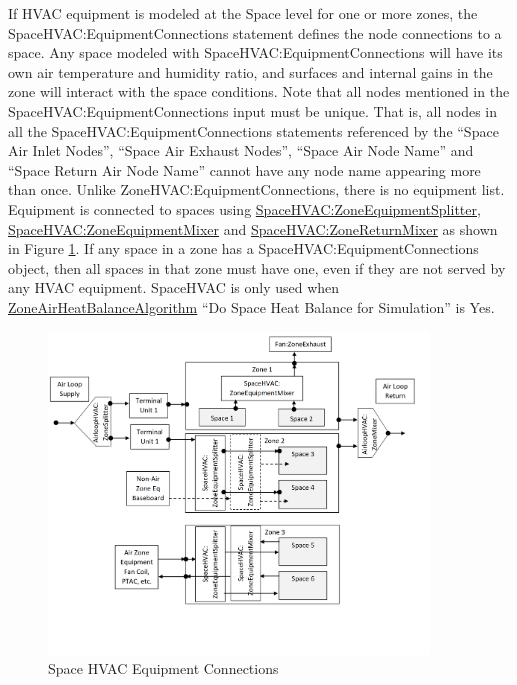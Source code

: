 If HVAC equipment is modeled at the Space level for one or more zones, the SpaceHVAC:EquipmentConnections statement defines the node connections to a space. Any space modeled with SpaceHVAC:EquipmentConnections will have its own air temperature and humidity ratio, and surfaces and internal gains in the zone will interact with the space conditions.
Note that all nodes mentioned in the SpaceHVAC:EquipmentConnections input must be unique. That is, all nodes in all the SpaceHVAC:EquipmentConnections statements referenced by the ``Space Air Inlet Nodes'', ``Space Air Exhaust Nodes'', ``Space Air Node Name'' and ``Space Return Air Node Name'' cannot have any node name appearing more than once. Unlike ZoneHVAC:EquipmentConnections, there is no equipment list. Equipment is connected to spaces using \hyperref[spacehvaczoneequipmentsplitter]{SpaceHVAC:ZoneEquipmentSplitter}, \hyperref[spacehvaczoneequipmentmixer]{SpaceHVAC:ZoneEquipmentMixer} and \hyperref[spacehvaczonereturnmixer]{SpaceHVAC:ZoneReturnMixer} as shown in Figure \ref{fig:space-hvac-equipment-connections}. If any space in a zone has a SpaceHVAC:EquipmentConnections object, then all spaces in that zone must have one, even if they are not served by any HVAC equipment. SpaceHVAC is only used when \hyperref[zoneairheatbalancealgorithm]{ZoneAirHeatBalanceAlgorithm} ``Do Space Heat Balance for Simulation'' is Yes.

\begin{figure}[hbtp]
\centering
\includegraphics[width=0.9\textwidth, height=0.9\textheight, keepaspectratio=true]{media/SpaceHVACSchematic2.png}
\caption{Space HVAC Equipment Connections \protect \label{fig:space-hvac-equipment-connections}}
\end{figure}


